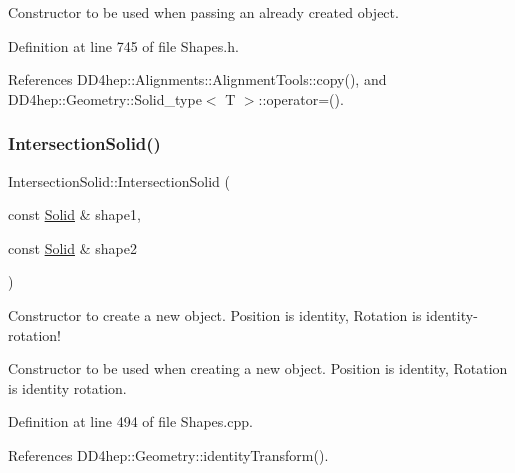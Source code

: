 Constructor to be used when passing an already created object. 



Definition at line 745 of file Shapes.\+h.



References D\+D4hep\+::\+Alignments\+::\+Alignment\+Tools\+::copy(), and D\+D4hep\+::\+Geometry\+::\+Solid\+\_\+type$<$ T $>$\+::operator=().

\hypertarget{class_d_d4hep_1_1_geometry_1_1_intersection_solid_a87844b8aab46a41e8b1a94e06c7ea88b}{}\label{class_d_d4hep_1_1_geometry_1_1_intersection_solid_a87844b8aab46a41e8b1a94e06c7ea88b} 
\subsubsection{\texorpdfstring{Intersection\+Solid()}{IntersectionSolid()}\hspace{0.1cm}{\footnotesize\ttfamily [4/8]}}
{\footnotesize\ttfamily Intersection\+Solid\+::\+Intersection\+Solid (\begin{DoxyParamCaption}\item[{const \hyperlink{namespace_d_d4hep_1_1_geometry_a83de90a8dcc7378ba47d54ef9a6a687b}{Solid} \&}]{shape1,  }\item[{const \hyperlink{namespace_d_d4hep_1_1_geometry_a83de90a8dcc7378ba47d54ef9a6a687b}{Solid} \&}]{shape2 }\end{DoxyParamCaption})}



Constructor to create a new object. Position is identity, Rotation is identity-\/rotation! 

Constructor to be used when creating a new object. Position is identity, Rotation is identity rotation. 

Definition at line 494 of file Shapes.\+cpp.



References D\+D4hep\+::\+Geometry\+::identity\+Transform().

\hypertarget{class_d_d4hep_1_1_geometry_1_1_intersection_solid_a4b62f2ea208c14e2d2ea4006bce4cc67}{}\label{class_d_d4hep_1_1_geometry_1_1_intersection_solid_a4b62f2ea208c14e2d2ea4006bce4cc67} 
